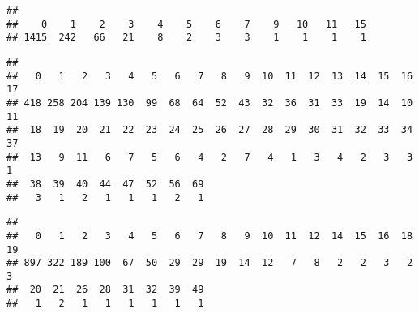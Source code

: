 \documentclass[]{article}
\newenvironment{Shaded}{\begin{snugshade}}{\end{snugshade}}
\newcommand{\KeywordTok}[1]{\textcolor[rgb]{0.13,0.29,0.53}{\textbf{#1}}}
\newcommand{\ControlFlowTok}[1]{\textcolor[rgb]{0.13,0.29,0.53}{\textbf{#1}}}
\newcommand{\OperatorTok}[1]{\textcolor[rgb]{0.81,0.36,0.00}{\textbf{#1}}}
\newcommand{\NormalTok}[1]{#1}
\begin{document}
\begin{verbatim}
## 
##    0    1    2    3    4    5    6    7    9   10   11   15 
## 1415  242   66   21    8    2    3    3    1    1    1    1
\end{verbatim}

\begin{Shaded}
\end{Shaded}

\begin{verbatim}
## 
##   0   1   2   3   4   5   6   7   8   9  10  11  12  13  14  15  16  17 
## 418 258 204 139 130  99  68  64  52  43  32  36  31  33  19  14  10  11 
##  18  19  20  21  22  23  24  25  26  27  28  29  30  31  32  33  34  37 
##  13   9  11   6   7   5   6   4   2   7   4   1   3   4   2   3   3   1 
##  38  39  40  44  47  52  56  69 
##   3   1   2   1   1   1   2   1
\end{verbatim}

\begin{Shaded}
\end{Shaded}

\begin{verbatim}
## 
##   0   1   2   3   4   5   6   7   8   9  10  11  12  14  15  16  18  19 
## 897 322 189 100  67  50  29  29  19  14  12   7   8   2   2   3   2   3 
##  20  21  26  28  31  32  39  49 
##   1   2   1   1   1   1   1   1
\end{verbatim}

\begin{Shaded}
\end{Shaded}
\end{document}
